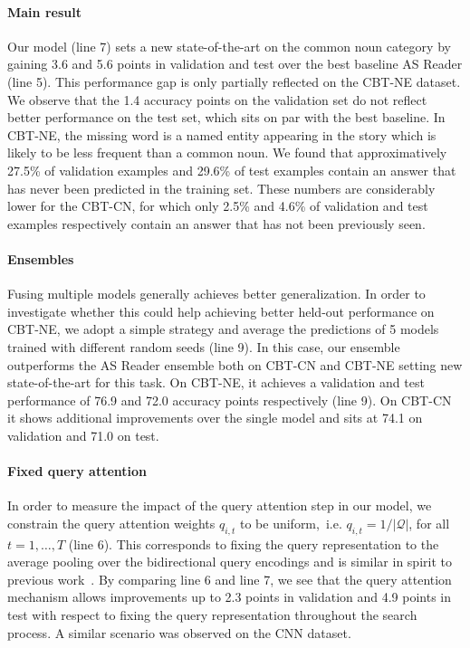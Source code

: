\documentclass[11pt]{article}
\begin{document}
\paragraph{Main result} Our model (line 7) sets a new state-of-the-art on the common noun category by gaining 3.6 and 5.6 points in validation and test over the best baseline AS Reader (line 5). This performance gap is only partially reflected on the CBT-NE dataset. We observe that the 1.4 accuracy points on the validation set do not reflect better performance on the test set, which sits on par with the best baseline. In CBT-NE, the missing word is a named entity appearing in the story which is likely to be less frequent than a common noun. We found that approximatively 27.5\% of validation examples and 29.6\% of test examples contain an answer that has never been predicted in the training set. These numbers are considerably lower for the CBT-CN, for which only 2.5\% and 4.6\% of validation and test examples respectively contain an answer that has not been previously seen.

\paragraph{Ensembles} Fusing multiple models generally achieves better generalization.
In order to investigate whether this could help achieving better held-out performance on CBT-NE, we adopt a simple strategy and average the predictions of 5 models trained with different random seeds (line 9). In this case, our ensemble outperforms the AS Reader ensemble both on CBT-CN and CBT-NE setting new state-of-the-art for this task. On CBT-NE, it achieves a validation and test performance of 76.9 and 72.0 accuracy points respectively (line 9). On CBT-CN it shows additional improvements over the single model and sits at 74.1 on validation and 71.0 on test.

\paragraph{Fixed query attention} In order to measure the impact of the query attention step in our model, we constrain the query attention weights $q_{i, t}$ to be uniform,~i.e. $q_{i, t} = 1/|\mathcal{Q}|$, for all $t = 1,\ldots,T$ (line 6). This corresponds to fixing the query representation to the average pooling over the bidirectional query encodings and is similar in spirit to previous work~\cite{watson,danqi}. By comparing line 6 and line 7, we see that the query attention mechanism allows improvements up to 2.3 points in validation and 4.9 points in test with respect to fixing the query representation throughout the search process. A similar scenario was observed on the CNN dataset.
\end{document}
